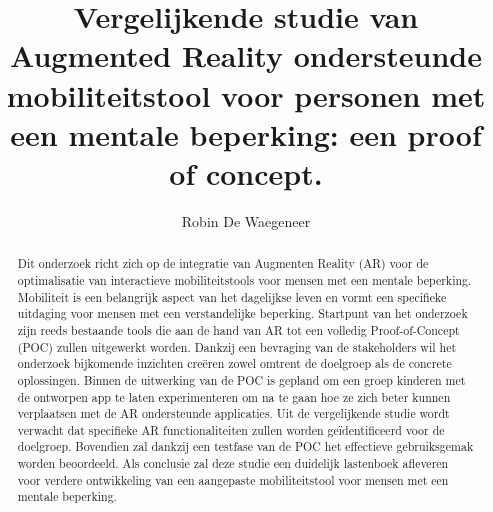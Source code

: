 \documentclass{hogent-article}
\title{Vergelijkende studie van Augmented Reality ondersteunde mobiliteitstool voor personen met een mentale beperking: een proof of concept.}
\author{Robin De Waegeneer}
\begin{document}

\begin{abstract}
    Dit onderzoek richt zich op de integratie van Augmenten Reality (AR) voor de optimalisatie van interactieve mobiliteitstools voor mensen met een mentale beperking. 
    Mobiliteit is een belangrijk aspect van het dagelijkse leven en vormt een specifieke uitdaging voor mensen met een verstandelijke beperking. 
    Startpunt van het onderzoek zijn reeds bestaande tools die aan de hand van AR tot een volledig Proof-of-Concept (POC) zullen uitgewerkt worden. 
    Dankzij een bevraging van de stakeholders wil het onderzoek bijkomende inzichten creëren zowel omtrent de doelgroep als de concrete oplossingen. 
    Binnen de uitwerking van de POC is gepland om een groep kinderen met de ontworpen app te laten experimenteren om na te gaan hoe ze zich beter kunnen verplaatsen met de AR ondersteunde applicaties. 
    Uit de vergelijkende studie wordt verwacht dat specifieke AR functionaliteiten zullen worden geïdentificeerd voor de doelgroep. 
    Bovendien zal dankzij een testfase van de POC het effectieve gebruiksgemak worden beoordeeld. 
    Als conclusie zal deze studie een duidelijk lastenboek afleveren voor verdere ontwikkeling van een aangepaste mobiliteitstool voor mensen met een mentale beperking.
\end{abstract}

\tableofcontents



\printbibliography[heading=bibintoc]
\end{document}
